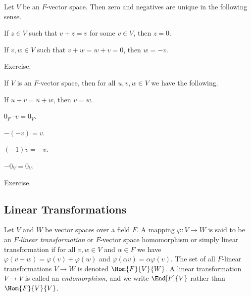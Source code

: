 \begin{prp}
\label{prp:vec-spa:uniq}
Let $V$ be an $F$-vector space. Then zero and negatives are unique in the following sense.
\begin{enumerate*}
\item{\label{prp:vec-spa:uniq:zero}} 
If $z \in V$ such that $v+z=v$ for some $v \in V$, then $z = 0$.
\item{\label{prp:vec-spa:uniq:neg}} 
If $v,w \in V$ such that $v+w=w+v=0$, then $w = -v$.
\end{enumerate*}
\end{prp}

\begin{theproof}
Exercise.
\end{theproof}

\begin{prp}
\label{prp:vec-spa:bookkeeping}
If $V$ is an $F$-vector space, then for all $u,v,w \in V$ we have the following.
\begin{enumerate*}
\item If $u+v = u+w$, then $v = w$.
\item $0_F \cdot v = 0_V$.
\item $-(-v) = v$.
\item $(-1)v = -v$.
\item $-0_V = 0_V$.
\end{enumerate*}
\end{prp}

\begin{theproof}
Exercise.
\end{theproof}

\subsection*{Linear Transformations}

\begin{dfn}
Let $V$ and $W$ be vector spaces over a field $F$. A mapping $\varphi : V \rightarrow W$ is said to be an \emph{$F$-linear transformation} or $F$-vector space homomorphism or simply linear transformation if for all $v,w \in V$ and $\alpha \in F$ we have $\varphi(v+w) = \varphi(v) + \varphi(w)$ and $\varphi(\alpha v) = \alpha\varphi(v)$. The set of all $F$-linear transformations $V \rightarrow W$ is denoted $\Hom{F}{V}{W}$. A linear transformation $V \rightarrow V$ is called an \emph{endomorphism}, and we write $\End[F]{V}$ rather than $\Hom{F}{V}{V}$.
\end{dfn}

